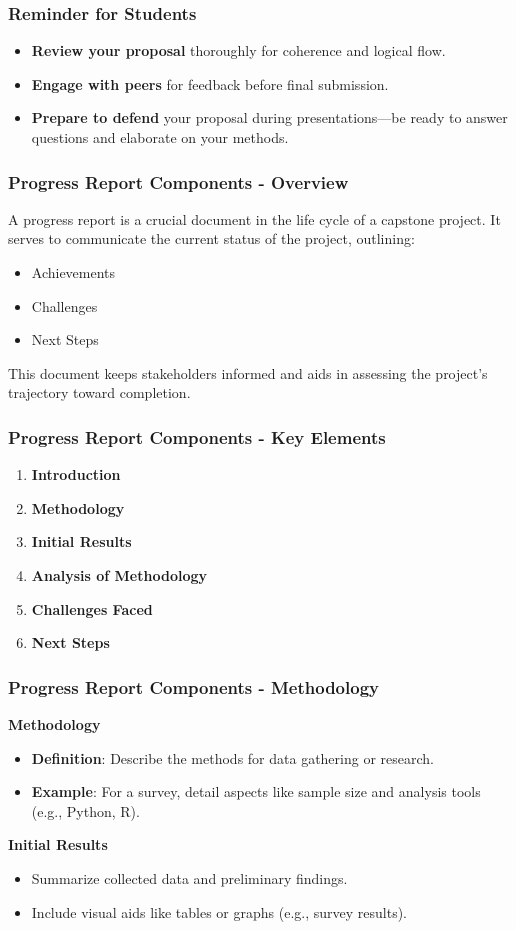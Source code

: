 \documentclass[aspectratio=169]{beamer}
\begin{document}
\begin{frame}[fragile]
    \frametitle{Reminder for Students}
    \begin{itemize}
        \item \textbf{Review your proposal} thoroughly for coherence and logical flow.
        \item \textbf{Engage with peers} for feedback before final submission.
        \item \textbf{Prepare to defend} your proposal during presentations—be ready to answer questions and elaborate on your methods.
    \end{itemize}
\end{frame}

\begin{frame}[fragile]
    \frametitle{Progress Report Components - Overview}
    A progress report is a crucial document in the life cycle of a capstone project. It serves to communicate the current status of the project, outlining:
    \begin{itemize}
        \item Achievements
        \item Challenges
        \item Next Steps
    \end{itemize}
    This document keeps stakeholders informed and aids in assessing the project's trajectory toward completion.
\end{frame}

\begin{frame}[fragile]
    \frametitle{Progress Report Components - Key Elements}
    \begin{enumerate}
        \item \textbf{Introduction}
        \item \textbf{Methodology}
        \item \textbf{Initial Results}
        \item \textbf{Analysis of Methodology}
        \item \textbf{Challenges Faced}
        \item \textbf{Next Steps}
    \end{enumerate}
\end{frame}

\begin{frame}[fragile]
    \frametitle{Progress Report Components - Methodology}
    \textbf{Methodology}
    \begin{itemize}
        \item \textbf{Definition}: Describe the methods for data gathering or research.
        \item \textbf{Example}: For a survey, detail aspects like sample size and analysis tools (e.g., Python, R).
    \end{itemize}
    
    \textbf{Initial Results}
    \begin{itemize}
        \item Summarize collected data and preliminary findings.
        \item Include visual aids like tables or graphs (e.g., survey results).
    \end{itemize}
\end{frame}
\end{document}
